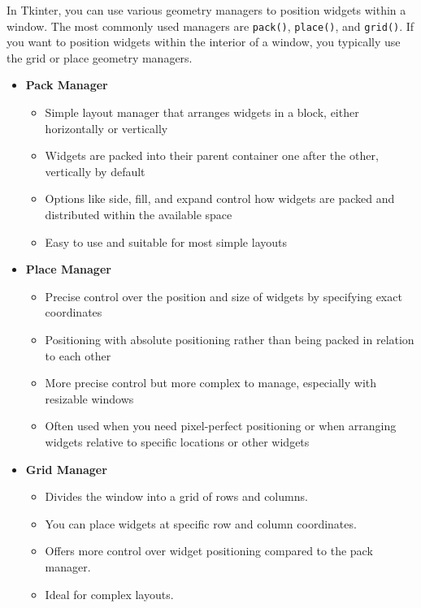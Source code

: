 In Tkinter, you can use various geometry managers to position widgets within a window. The most commonly used managers are \texttt{pack()}, \texttt{place()}, and \texttt{grid()}. If you want to position widgets within the interior of a window, you typically use the grid or place geometry managers.

\begin{itemize}
    \item \textbf{Pack Manager}
    \begin{itemize}
        \item Simple layout manager that arranges widgets in a block, either horizontally or vertically
        \item Widgets are packed into their parent container one after the other, vertically by default
        \item Options like side, fill, and expand control how widgets are packed and distributed within the available space
        \item Easy to use and suitable for most simple layouts
    \end{itemize}
    
    \item \textbf{Place Manager}
    \begin{itemize}
        \item Precise control over the position and size of widgets by specifying exact coordinates
        \item Positioning with absolute positioning rather than being packed in relation to each other
        \item More precise control but more complex to manage, especially with resizable windows
        \item Often used when you need pixel-perfect positioning or when arranging widgets relative to specific locations or other widgets
    \end{itemize}
    
        \item \textbf{Grid Manager}
    \begin{itemize}
           \item Divides the window into a grid of rows and columns.
    		   \item You can place widgets at specific row and column coordinates.
    		   \item Offers more control over widget positioning compared to the pack manager.
    \item Ideal for complex layouts.
    \end{itemize}
\end{itemize}

